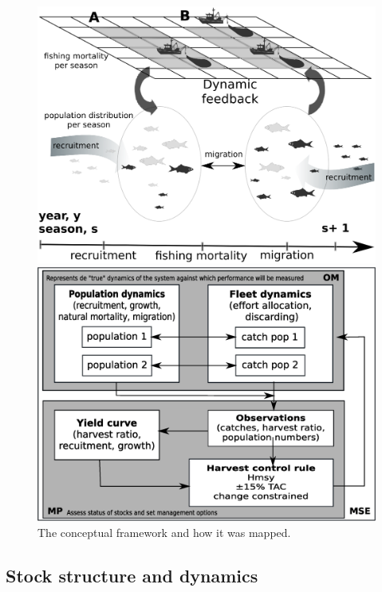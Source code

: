 \documentclass[12pt,oneline,a4paper,numbib]{ouparticle}
\numberwithin{equation}{subsection} %
\begin{document}
\begin{figure}[!h]
\centering
\begin{minipage}{.4\textwidth}
\includegraphics[width=\textwidth]{Figures/Areadynamics.eps} 
\end{minipage}
\hfill
\begin{minipage}{.5\textwidth}
\includegraphics[width=\textwidth]{Figures/MSE.eps} 
\end{minipage}
\caption{The conceptual framework and how it was mapped.}
\end{figure}

\subsection{Stock structure and dynamics}
\label{sec2.1}
\end{document}
